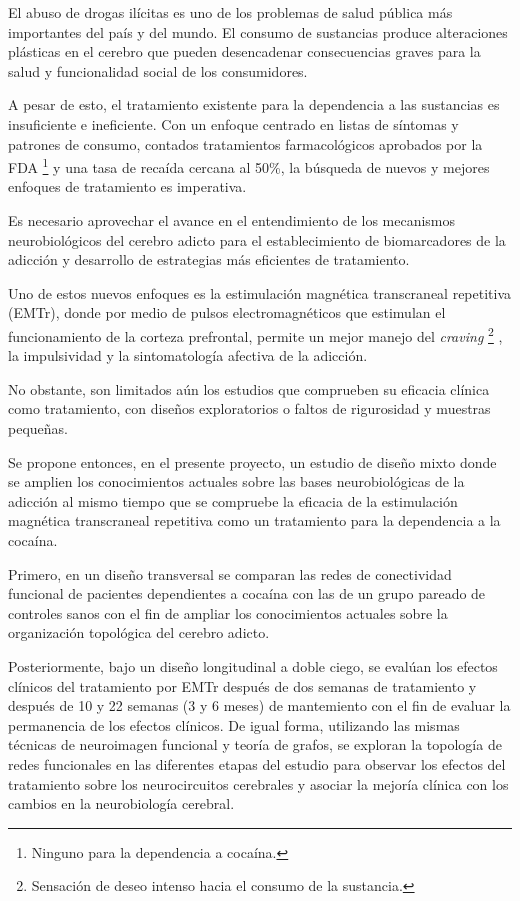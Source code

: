 El abuso de drogas ilícitas es uno de los problemas de salud pública más
importantes del país y del mundo.
El consumo de sustancias produce alteraciones plásticas en el
cerebro que pueden desencadenar consecuencias graves para la salud y funcionalidad
social de los consumidores. \par
A pesar de esto, el tratamiento existente para la dependencia a las sustancias es insuficiente e ineficiente.
Con un enfoque centrado en listas de síntomas y patrones de consumo, contados tratamientos farmacológicos aprobados por la FDA
\footnote{Ninguno para la dependencia a cocaína.}
y una tasa de recaída cercana al 50\%, la búsqueda de nuevos y mejores enfoques de tratamiento es imperativa.\par
Es necesario aprovechar el avance en el entendimiento de los mecanismos neurobiológicos del cerebro adicto para el establecimiento de biomarcadores de la adicción y desarrollo de estrategias más eficientes de tratamiento.\par
Uno de estos nuevos enfoques es la estimulación magnética transcraneal repetitiva (EMTr), donde por medio de pulsos electromagnéticos que estimulan el funcionamiento de la corteza prefrontal, permite un mejor manejo del \textit{craving}
\footnote{Sensación de deseo intenso hacia el consumo de la sustancia.}
, la impulsividad y la sintomatología afectiva de la adicción. \par
No obstante, son limitados aún los estudios que comprueben su eficacia clínica como tratamiento, con diseños exploratorios o faltos de rigurosidad y muestras pequeñas. \par
Se propone entonces, en el presente proyecto, un estudio de diseño mixto donde se amplien los conocimientos actuales sobre las bases neurobiológicas de la adicción al mismo tiempo que se compruebe la eficacia de la estimulación magnética transcraneal repetitiva como un tratamiento para la dependencia a la cocaína.\par
Primero, en un diseño transversal se comparan las redes de conectividad funcional de pacientes dependientes a cocaína con las de un grupo pareado de controles sanos con el fin de ampliar los conocimientos actuales sobre la organización topológica del cerebro adicto.\par
Posteriormente, bajo un diseño longitudinal a doble ciego, se evalúan los efectos clínicos del tratamiento por EMTr después de dos semanas de tratamiento y después de 10 y 22 semanas (3 y 6 meses) de mantemiento con el fin de evaluar la permanencia de los efectos clínicos. De igual forma, utilizando las mismas técnicas de neuroimagen funcional y teoría de grafos, se exploran la topología de redes funcionales en las diferentes etapas del estudio para observar los efectos del tratamiento sobre los neurocircuitos cerebrales y asociar la mejoría clínica con los cambios en la neurobiología cerebral.
